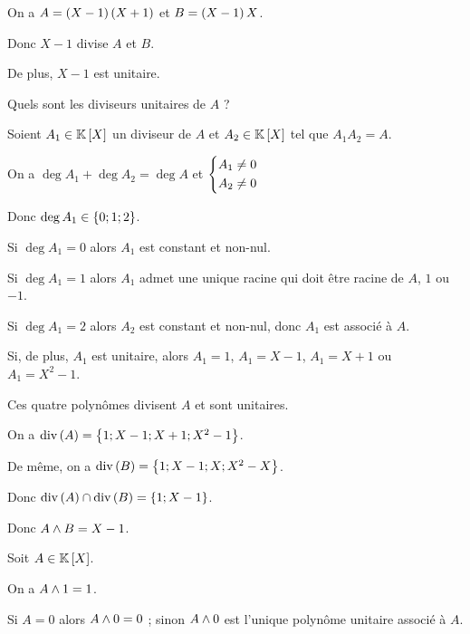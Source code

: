 \begin{dem}
On a \(A=\left(X-1\right)\left(X+1\right)\) et \(B=\left(X-1\right)X\).

Donc \(X-1\) divise \(A\) et \(B\).

De plus, \(X-1\) est unitaire.

Quels sont les diviseurs unitaires de \(A\) ?

\analyse

Soient \(A_1\in\poly\) un diviseur de \(A\) et \(A_2\in\poly\) tel que \(A_1A_2=A\).

On a \(\deg A_1+\deg A_2=\deg A\) et \(\begin{dcases}A_1\not=0 \\ A_2\not=0\end{dcases}\)

Donc \(\deg A_1\in\left\lbrace0;1;2\right\rbrace\).

Si \(\deg A_1=0\) alors \(A_1\) est constant et non-nul.

Si \(\deg A_1=1\) alors \(A_1\) admet une unique racine qui doit être racine de \(A\), \ie \(1\) ou \(-1\).

Si \(\deg A_1=2\) alors \(A_2\) est constant et non-nul, donc \(A_1\) est associé à \(A\).

Si, de plus, \(A_1\) est unitaire, alors \(A_1=1\), \(A_1=X-1\), \(A_1=X+1\) ou \(A_1=X^2-1\).

\synthese

Ces quatre polynômes divisent \(A\) et sont unitaires.

\conclusion

On a \(\operatorname{div}\left(A\right)=\left\lbrace1;X-1;X+1;X^2-1\right\rbrace\).

De même, on a \(\operatorname{div}\left(B\right)=\left\lbrace1;X-1;X;X^2-X\right\rbrace\).

Donc \(\operatorname{div}\left(A\right)\cap\operatorname{div}\left(B\right)=\left\lbrace1;X-1\right\rbrace\).

Donc \(A\land B=X-1\).
\end{dem}

\begin{rem}
Soit \(A\in\poly\).

On a \(A\land1=1\).

Si \(A=0\) alors \(A\land0=0\) ; sinon \(A\land0\) est l'unique polynôme unitaire associé à \(A\).
\end{rem}

